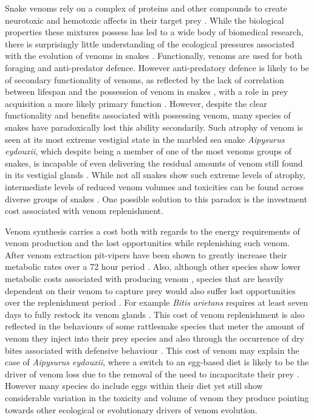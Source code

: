 Snake venoms rely on a complex of proteins and other compounds to create neurotoxic and hemotoxic affects in their target prey \citep{greene1997snakes,casewell2013complex}. While the biological properties these mixtures possess has led to a wide body of biomedical research, there is surprisingly little understanding of the ecological pressures associated with the evolution of venoms in snakes \citep{greene1997snakes,casewell2013complex}. Functionally, venoms are used for both foraging and anti-predator defence. However anti-predatory defence is likely to be of secondary functionality of venoms, as reflected by the lack of correlation between lifespan and the possession of venom in snakes \citep{hossie2013species}, with a role in prey acquisition a more likely primary function \citep{casewell2013complex}. However, despite the clear functionality and benefits associated with possessing venom, many species of snakes have paradoxically lost this ability secondarily. Such atrophy of venom is seen at its most extreme vestigial state in the marbled sea snake \textit{Aipysurus eydouxii}, which despite being a member of one of the most venoms groups of snakes, is incapable of even delivering the residual amounts of venom still found in its vestigial glands \citep{li2005eggs}. While not all snakes show such extreme levels of atrophy, intermediate levels of reduced venom volumes and toxicities can be found across diverse groups of snakes \citep{fry2012structural}. One possible solution to this paradox is the investment cost associated with venom replenishment.


Venom synthesis carries a cost both with regards to the energy requirements of venom production and the lost opportunities while replenishing such venom. After venom extraction pit-vipers have been shown to greatly increase their metabolic rates over a 72 hour period \cite{mccue2006cost}. Also, although other species show lower metabolic costs associated with producing venom \citep{pintor2010costs}, species that are heavily dependent on their venom to capture prey would also suffer lost opportunities over the replenishment period \citep{young2002snakes}. For example \textit{Bitis arietans} requires at least seven days to fully restock its venom glands \citep{currier2012unusual}. This cost of venom replenishment is also reflected in the behaviours of some rattlesnake species that meter the amount of venom they inject into their prey species \citep{hayes1995venom} and also through the occurrence of dry bites associated with defensive behaviour \citep{morgenstern2013venom}. This cost of venom may explain the case of \textit{Aipysurus eydouxii}, where a switch to an egg-based diet is likely to be the driver of venom loss due to the removal of the need to incapacitate their prey \citep{li2005eggs}. However many species do include eggs within their diet \citep{de2006historical} yet still show considerable variation in the toxicity and volume of venom they produce pointing towards other ecological or evolutionary drivers of venom evolution.



